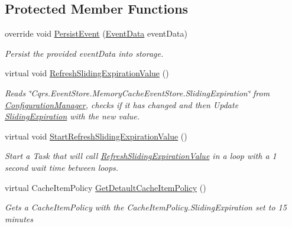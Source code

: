 \subsection*{Protected Member Functions}
\begin{DoxyCompactItemize}
\item 
override void \hyperlink{classCqrs_1_1Events_1_1MemoryCacheEventStore_a9b1a1aaab34770bd68ebcedca0fc40b0_a9b1a1aaab34770bd68ebcedca0fc40b0}{Persist\+Event} (\hyperlink{classCqrs_1_1Events_1_1EventData}{Event\+Data} event\+Data)
\begin{DoxyCompactList}\small\item\em Persist the provided {\itshape event\+Data}  into storage. \end{DoxyCompactList}\item 
virtual void \hyperlink{classCqrs_1_1Events_1_1MemoryCacheEventStore_a4cac39acb87d9e25c4c090a384515d11_a4cac39acb87d9e25c4c090a384515d11}{Refresh\+Sliding\+Expiration\+Value} ()
\begin{DoxyCompactList}\small\item\em Reads \char`\"{}\+Cqrs.\+Event\+Store.\+Memory\+Cache\+Event\+Store.\+Sliding\+Expiration\char`\"{} from \hyperlink{classCqrs_1_1Events_1_1MemoryCacheEventStore_a8a4fc4fa5d767e4d15344daf1ba7ea01_a8a4fc4fa5d767e4d15344daf1ba7ea01}{Configuration\+Manager}, checks if it has changed and then Update \hyperlink{classCqrs_1_1Events_1_1MemoryCacheEventStore_a93423872cdd702ee6257c0cc704c0c06_a93423872cdd702ee6257c0cc704c0c06}{Sliding\+Expiration} with the new value. \end{DoxyCompactList}\item 
virtual void \hyperlink{classCqrs_1_1Events_1_1MemoryCacheEventStore_ac2a6da8b2faac7bd5f333bff592fc8f2_ac2a6da8b2faac7bd5f333bff592fc8f2}{Start\+Refresh\+Sliding\+Expiration\+Value} ()
\begin{DoxyCompactList}\small\item\em Start a Task that will call \hyperlink{classCqrs_1_1Events_1_1MemoryCacheEventStore_a4cac39acb87d9e25c4c090a384515d11_a4cac39acb87d9e25c4c090a384515d11}{Refresh\+Sliding\+Expiration\+Value} in a loop with a 1 second wait time between loops. \end{DoxyCompactList}\item 
virtual Cache\+Item\+Policy \hyperlink{classCqrs_1_1Events_1_1MemoryCacheEventStore_a2dddf1e1c4c737ad393655ee990953b3_a2dddf1e1c4c737ad393655ee990953b3}{Get\+Detault\+Cache\+Item\+Policy} ()
\begin{DoxyCompactList}\small\item\em Get\textquotesingle{}s a Cache\+Item\+Policy with the Cache\+Item\+Policy.\+Sliding\+Expiration set to 15 minutes \end{DoxyCompactList}\end{DoxyCompactItemize}
